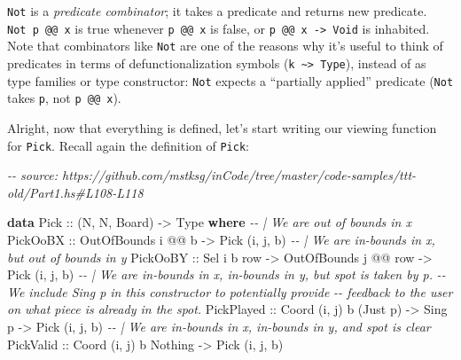 \documentclass[]{article}
\newenvironment{Shaded}{}{}
\newcommand{\CommentTok}[1]{\textcolor[rgb]{0.38,0.63,0.69}{\textit{#1}}}
\newcommand{\DataTypeTok}[1]{\textcolor[rgb]{0.56,0.13,0.00}{#1}}
\newcommand{\KeywordTok}[1]{\textcolor[rgb]{0.00,0.44,0.13}{\textbf{#1}}}
\newcommand{\NormalTok}[1]{#1}
\newcommand{\OperatorTok}[1]{\textcolor[rgb]{0.40,0.40,0.40}{#1}}
\newcommand{\OtherTok}[1]{\textcolor[rgb]{0.00,0.44,0.13}{#1}}
\begin{document}
\texttt{Not} is a \emph{predicate combinator}; it takes a predicate and returns
new predicate. \texttt{Not\ p\ @@\ x} is true whenever \texttt{p\ @@\ x} is
false, or \texttt{p\ @@\ x\ -\textgreater{}\ Void} is inhabited. Note that
combinators like \texttt{Not} are one of the reasons why it's useful to think of
predicates in terms of defunctionalization symbols
(\texttt{k\ \textasciitilde{}\textgreater{}\ Type}), instead of as type families
or type constructor: \texttt{Not} expects a ``partially applied'' predicate
(\texttt{Not} takes \texttt{p}, not \texttt{p\ @@\ x}).

Alright, now that everything is defined, let's start writing our viewing
function for \texttt{Pick}. Recall again the definition of \texttt{Pick}:

\begin{Shaded}
\begin{Highlighting}[]
\CommentTok{{-}{-} source: https://github.com/mstksg/inCode/tree/master/code{-}samples/ttt{-}old/Part1.hs\#L108{-}L118}

\KeywordTok{data} \DataTypeTok{Pick}\OtherTok{ ::}\NormalTok{ (}\DataTypeTok{N}\NormalTok{, }\DataTypeTok{N}\NormalTok{, }\DataTypeTok{Board}\NormalTok{) }\OtherTok{{-}\textgreater{}} \DataTypeTok{Type} \KeywordTok{where}
    \CommentTok{{-}{-} | We are out of bounds in x}
    \DataTypeTok{PickOoBX}\OtherTok{   ::} \DataTypeTok{OutOfBounds}\NormalTok{ i }\OperatorTok{@@}\NormalTok{ b                         }\OtherTok{{-}\textgreater{}} \DataTypeTok{Pick}\NormalTok{ \textquotesingle{}(i, j, b)}
    \CommentTok{{-}{-} | We are in{-}bounds in x, but out of bounds in y}
    \DataTypeTok{PickOoBY}\OtherTok{   ::} \DataTypeTok{Sel}\NormalTok{ i b row        }\OtherTok{{-}\textgreater{}} \DataTypeTok{OutOfBounds}\NormalTok{ j }\OperatorTok{@@}\NormalTok{ row }\OtherTok{{-}\textgreater{}} \DataTypeTok{Pick}\NormalTok{ \textquotesingle{}(i, j, b)}
    \CommentTok{{-}{-} | We are in{-}bounds in x, in{-}bounds in y, but spot is taken by \textasciigrave{}p\textasciigrave{}.}
    \CommentTok{{-}{-} We include \textasciigrave{}Sing p\textasciigrave{} in this constructor to potentially provide}
    \CommentTok{{-}{-} feedback to the user on what piece is already in the spot.}
    \DataTypeTok{PickPlayed}\OtherTok{ ::} \DataTypeTok{Coord}\NormalTok{ \textquotesingle{}(i, j) b (}\DataTypeTok{\textquotesingle{}Just}\NormalTok{ p) }\OtherTok{{-}\textgreater{}} \DataTypeTok{Sing}\NormalTok{ p        }\OtherTok{{-}\textgreater{}} \DataTypeTok{Pick}\NormalTok{ \textquotesingle{}(i, j, b)}
    \CommentTok{{-}{-} | We are in{-}bounds in x, in{-}bounds in y, and spot is clear}
    \DataTypeTok{PickValid}\OtherTok{  ::} \DataTypeTok{Coord}\NormalTok{ \textquotesingle{}(i, j) b }\DataTypeTok{\textquotesingle{}Nothing}                   \OtherTok{{-}\textgreater{}} \DataTypeTok{Pick}\NormalTok{ \textquotesingle{}(i, j, b)}
\end{Highlighting}
\end{Shaded}
\end{document}
